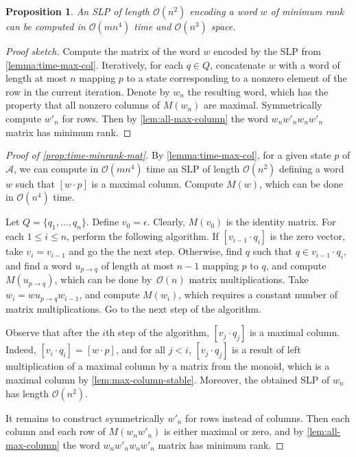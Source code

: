 \documentclass[11pt,a4paper]{amsart}
\newcommand{\OO}{\mathcal{O}}
\newcommand{\Aa}{\mathcal{A}}
\theoremstyle{plain}
\newtheorem{prop}[thm]{Proposition}
\theoremstyle{definition}
\theoremstyle{defC}
\theoremstyle{thmC}
\theoremstyle{plain}
\numberwithin{equation}{section}
\begin{document}
\begin{prop}\label{prop:time-minrank-mat}
    An SLP of length $\OO(n^2)$ encoding a word $w$ of minimum rank can be computed in $\OO(mn^4)$ time and $\OO(n^3)$ space.
\end{prop}
\begin{proof}[Proof sketch]
 Compute the matrix of the word $w$ encoded by the SLP from \autoref{lemma:time-max-col}. Iteratively, for each $q \in Q$, concatenate $w$ with a word of length at most $n$ mapping $p$ to a state corresponding to a nonzero element of the row in the current iteration. Denote by $w_n$ the resulting word, which has the property that all nonzero columns of $M(w_n)$ are maximal. Symmetrically compute $w'_n$ for rows. Then by \autoref{lem:all-max-column} the word $w_{n}w'_{n}w_{n}w'_{n}$ matrix has minimum rank.
\end{proof}
\begin{proof}[Proof of \autoref{prop:time-minrank-mat}]
By \autoref{lemma:time-max-col},
for a given state $p$ of $\Aa$, we can compute in $\OO(mn^4)$ time an SLP of length $\OO(n^2)$ defining a word $w$ such that $[w \cdot p]$ is a maximal column. Compute $M(w)$, which can be done in  $\OO(n^4)$ time.

Let $Q = \{q_1, \ldots, q_n\}$. Define $v_0 = \epsilon$. Clearly, $M(v_0)$ is the identity matrix. 
For each $1 \le i \le n$, perform the following algorithm. If $[v_{i - 1} \cdot q_i]$ is the zero vector, take $v_i = v_{i - 1}$ and go the the next step. Otherwise, find $q$ such that $q \in v_{i - 1} \cdot q_i$, and 
find a word $u_{p \to q}$ of length at most $n - 1$ mapping $p$ to $q$, and compute $M(u_{p \to q})$, which can be done by~$\OO(n)$ matrix multiplications. Take $w_i = w u_{p \to q} w_{i - 1}$, and compute $M(w_i)$, which requires a constant number of matrix multiplications. Go to the next step of the algorithm.

Observe that after the $i$th step of the algorithm, $[v_j \cdot q_j]$ is a maximal column. Indeed, $[v_i \cdot q_i] = [w \cdot p]$, and for all $j < i$, $[v_j \cdot q_j]$ is a result of left multiplication of a maximal column by a matrix from the monoid, which is a maximal column by \autoref{lem:max-column-stable}.
Moreover, the obtained SLP of $w_{n}$ has length $\OO(n^2)$.

It remains to construct symmetrically $w'_{n}$ for rows instead of columns. Then each column and each row of $M(w_{n}w'_{n})$ is either maximal or zero, and by \autoref{lem:all-max-column} the word $w_{n}w'_{n}w_{n}w'_{n}$ matrix has minimum rank.
\end{proof}
\end{document}
